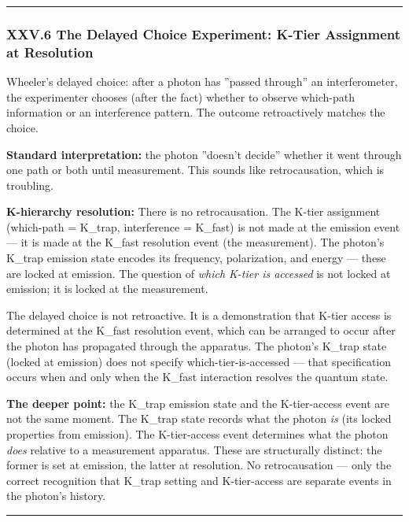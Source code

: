 \documentclass[12pt,a4paper]{article}
\begin{document}
\begin{center}
\rule{0.5\textwidth}{0.4pt}
\end{center}

\subsubsection{XXV.6 The Delayed Choice Experiment: K-Tier Assignment at Resolution}

Wheeler's delayed choice: after a photon has ''passed through'' an interferometer, the experimenter chooses (after the fact) whether to observe which-path information or an interference pattern. The outcome retroactively matches the choice.

\textbf{Standard interpretation:} the photon ''doesn't decide'' whether it went through one path or both until measurement. This sounds like retrocausation, which is troubling.

\textbf{K-hierarchy resolution:} There is no retrocausation. The K-tier assignment (which-path = K\_trap, interference = K\_fast) is not made at the emission event --- it is made at the K\_fast resolution event (the measurement). The photon's K\_trap emission state encodes its frequency, polarization, and energy --- these are locked at emission. The question of \emph{which K-tier is accessed} is not locked at emission; it is locked at the measurement.

The delayed choice is not retroactive. It is a demonstration that K-tier access is determined at the K\_fast resolution event, which can be arranged to occur after the photon has propagated through the apparatus. The photon's K\_trap state (locked at emission) does not specify which-tier-is-accessed --- that specification occurs when and only when the K\_fast interaction resolves the quantum state.

\textbf{The deeper point:} the K\_trap emission state and the K-tier-access event are not the same moment. The K\_trap state records what the photon \emph{is} (its locked properties from emission). The K-tier-access event determines what the photon \emph{does} relative to a measurement apparatus. These are structurally distinct: the former is set at emission, the latter at resolution. No retrocausation --- only the correct recognition that K\_trap setting and K-tier-access are separate events in the photon's history.

\begin{center}
\rule{0.5\textwidth}{0.4pt}
\end{center}
\end{document}
